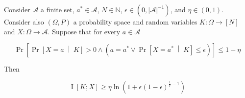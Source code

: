 \documentclass[anon,12pt]{colt2018} %
\newcommand{\AP}[1]{\left(#1\right)}
\newcommand{\AB}[1]{\left[#1\right]}
\newcommand{\ABM}[2]{\left[#1\;\middle\vert\;#2\right]}
\newcommand{\Pa}[2]{\underset{#1}{\operatorname{Pr}}\AB{#2}}
\newcommand{\CP}[3]{\underset{#1}{\operatorname{Pr}}\ABM{#2}{#3}}
\newcommand{\Ia}[2]{\underset{#1}{\operatorname{I}}\AB{#2}}
\newcommand{\Nats}{\mathbb{N}}
\newcommand{\Abs}[1]{\left\vert #1 \right\vert}
\newcommand{\A}{\mathcal{A}}
\begin{document}
\begin{samepage}
\begin{proposition}
\label{prp:delegation_information}

Consider $\A$ a finite set, $a^*\in\A$, $N \in \Nats$, $\epsilon \in \AP{0,{\Abs{\A}}^{-1}}$, and $\eta \in (0,1)$. Consider also $(\Omega,P)$ a probability space and random variables $K: \Omega \rightarrow [N]$ and $X: \Omega \rightarrow \A$. Suppose that for every $a \in \A$

\begin{equation}
\Pa{}{\CP{}{X=a}{K} > 0 \land \AP{a = a^* \lor \CP{}{X = a^*}{K} \leq \epsilon}} \leq 1 - \eta
\end{equation}

Then

\begin{equation}
\Ia{}{K;X} \geq \eta \ln\left(1 + \epsilon(1-\epsilon)^{\frac{1}{\epsilon}-1}\right)
\end{equation}

\end{proposition}
\end{samepage}
\end{document}

